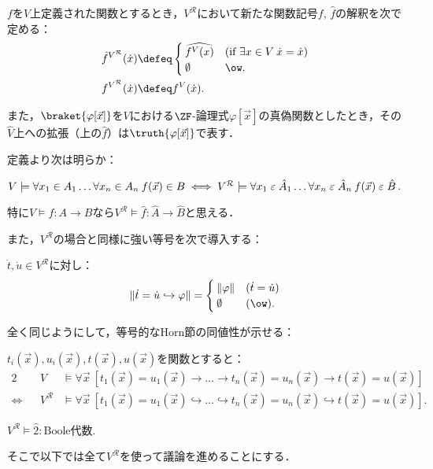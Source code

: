 \documentclass[realisability.tex]{subfiles}
\begin{document}
\begin{definition}
 $f$を$V$上定義された関数とするとき，$V^{\mathcal{R}}$において新たな関数記号$f$, $\hat{f}$の解釈を次で定める： 
 \begin{align*}
  \hat{f}^{V^{\mathcal{R}}}(\dot{x}) &\defeq
  \begin{cases}
   \widehat{f^V(x)} & (\text{if } \exists x \in V \: \dot{x} = \hat{x})\\
   \emptyset & \ow.
  \end{cases}\\
  f^{V^{\mathcal{R}}}(\dot{x}) &\defeq f^V(\dot{x}).
 \end{align*} 

 また，$\braket{\varphi[\vec{x}]}$を$V$における$\ZF$-論理式$\varphi[\vec{x}]$の真偽関数としたとき，その$\hat{V}$上への拡張（上の$\hat{f}$）は$\truth{\varphi[\vec{x}]}$で表す．
\end{definition}
定義より次は明らか：
\begin{lemma}
 $V \models \forall x_1 \in A_1 \dots \forall x_n \in A_n \: f(\vec{x}) \in B \iff V^{\mathcal{R}} \models \forall x_1 \mathrel{\varepsilon} \hat{A}_1 \dots \forall x_n \mathrel{\varepsilon} \hat{A}_n \: f(\vec{x}) \mathrel{\varepsilon} \hat{B}$.

 特に$V \models f: A \to B$なら$V^{\mathcal{R}} \models \hat{f}: \hat{A} \to \hat{B}$と思える．
\end{lemma}
また，$V^{\mathcal{R}}$の場合と同様に強い等号を次で導入する：
\begin{definition}
 $\dot{t}, \dot{u} \in V^{\mathcal{R}}$に対し：
 \[
 \|\dot{t} = \dot{u} \hookrightarrow \varphi \| =
 \begin{cases}
  \|\varphi\| & (\dot{t} = \dot{u})\\
  \emptyset & (\ow).
 \end{cases}
 \]
\end{definition}
全く同じようにして，等号的なHorn節の同値性が示せる：
\begin{lemma}
 $t_i(\vec{x}), u_i(\vec{x}), t(\vec{x}), u(\vec{x})$を関数とすると：
 \begin{alignat*}{2}
  &&V &\models \forall \vec{x}\:\left[t_1(\vec{x}) = u_1(\vec{x}) \to \dots \to t_n(\vec{x}) = u_n(\vec{x}) \to t(\vec{x}) = u(\vec{x})\right]\\
 \iff
 &&V^{\mathcal{R}} &\models \forall \vec{x}\:\left[t_1(\vec{x}) = u_1(\vec{x}) \hookrightarrow \dots \hookrightarrow t_n(\vec{x}) = u_n(\vec{x}) \hookrightarrow t(\vec{x}) = u(\vec{x})\right].
 \end{alignat*}
\end{lemma}
\begin{corollary}
 $V^{\mathcal{R}} \models \hat{2}: \text{Boole代数}$.
\end{corollary}
そこで以下では全て$V^{\mathcal{R}}$を使って議論を進めることにする．
\end{document}
